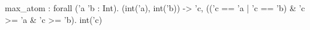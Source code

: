 max_atom : forall ('a 'b : Int). (int('a), int('b)) -> {'c, (('c == 'a | 'c == 'b) & 'c >= 'a & 'c >= 'b). int('c)}